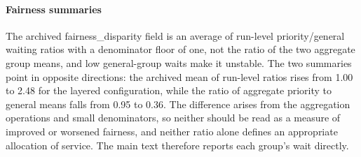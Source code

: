 \paragraph{Fairness summaries} The archived fairness\_disparity field is an average of run-level priority/general waiting ratios with a denominator floor of one, not the ratio of the two aggregate group means, and low general-group waits make it unstable. The two summaries point in opposite directions: the archived mean of run-level ratios rises from 1.00 to 2.48 for the layered configuration, while the ratio of aggregate priority to general means falls from 0.95 to 0.36. The difference arises from the aggregation operations and small denominators, so neither should be read as a measure of improved or worsened fairness, and neither ratio alone defines an appropriate allocation of service. The main text therefore reports each group's wait directly.

